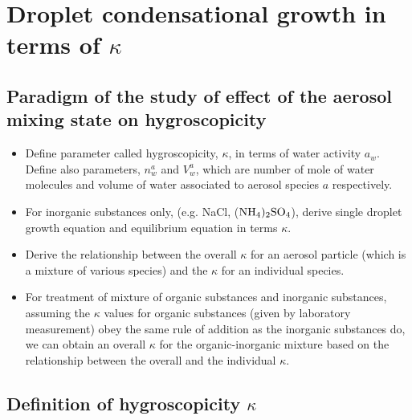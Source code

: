 \documentclass[12pt]{article}
\begin{document}


\section{Droplet condensational growth in terms of $\kappa$}

\subsection{Paradigm of the study of effect of the aerosol mixing state on hygroscopicity}

\begin{itemize}

\item Define parameter called hygroscopicity, $\kappa$, in terms of water activity $a_{w}$. Define also parameters, $n_{w}^{a}$ and $V_{w}^{a}$, which are number of mole of water molecules and volume of water associated to aerosol species $a$ respectively. 

\item For inorganic substances only, (e.g. NaCl, ($ \rm NH_{4})_{2} \rm SO_{4}$), derive single droplet growth equation and equilibrium equation in terms $\kappa$.

\item Derive the relationship between the overall $\kappa$ for an aerosol particle (which is a mixture of various species) and the $\kappa$ for an individual species. 

\item For treatment of mixture of organic substances and inorganic substances, assuming the $\kappa$ values for organic substances (given by laboratory measurement) obey the same rule of addition as the inorganic substances do, we can obtain an overall $\kappa$ for the organic-inorganic mixture based on the relationship between the overall and the individual $\kappa$.

\end{itemize}

\subsection{Definition of hygroscopicity $\kappa$}
\end{document}
